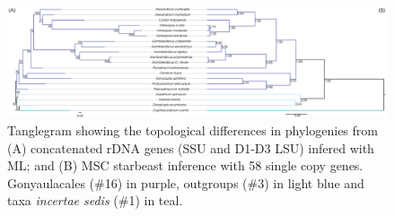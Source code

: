 \documentclass[12pt]{article}
\begin{document}
\begin{figure} 
\includegraphics[scale=.2]{figures/MSC-BI_vs_rDNA-ML.png} 
\caption{Tanglegram showing the topological differences in phylogenies from (A) concatenated rDNA genes (SSU and D1-D3 LSU) infered with ML; and (B) MSC starbeast inference with 58 single copy genes. Gonyaulacales (\#16) in purple, outgroups (\#3) in light blue and taxa \textit{incertae sedis} (\#1) in teal.} 
\label{fig:tanglerDNA}
\end{figure} 
\FloatBarrier
\end{document}
